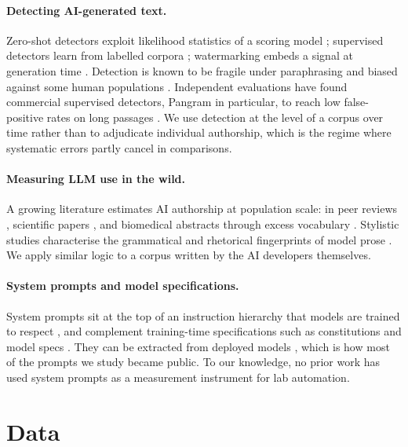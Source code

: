 \documentclass[11pt]{article}
\begin{document}
\paragraph{Detecting AI-generated text.}
Zero-shot detectors exploit likelihood statistics of a scoring model \citep{mitchell2023detectgpt,bao2024fastdetectgpt,hans2024binoculars}; supervised detectors learn from labelled corpora \citep{verma2024ghostbuster,emi2024pangram}; watermarking embeds a signal at generation time \citep{kirchenbauer2023watermark}. Detection is known to be fragile under paraphrasing \citep{sadasivan2023detect} and biased against some human populations \citep{liang2023bias}. Independent evaluations have found commercial supervised detectors, Pangram in particular, to reach low false-positive rates on long passages \citep{jabarian2025detection}. We use detection at the level of a corpus over time rather than to adjudicate individual authorship, which is the regime where systematic errors partly cancel in comparisons.

\paragraph{Measuring LLM use in the wild.}
A growing literature estimates AI authorship at population scale: in peer reviews \citep{liang2024peer}, scientific papers \citep{liang2024papers}, and biomedical abstracts through excess vocabulary \citep{kobak2025delving}. Stylistic studies characterise the grammatical and rhetorical fingerprints of model prose \citep{reinhart2025pnas}. We apply similar logic to a corpus written by the AI developers themselves.

\paragraph{System prompts and model specifications.}
System prompts sit at the top of an instruction hierarchy that models are trained to respect \citep{wallace2024hierarchy}, and complement training-time specifications such as constitutions and model specs \citep{bai2022cai,anthropic2026constitution,openai2024modelspec}. They can be extracted from deployed models \citep{perez2022ignore,zhang2024extraction}, which is how most of the prompts we study became public. To our knowledge, no prior work has used system prompts as a measurement instrument for lab automation.

\section{Data}
\label{sec:data}
\end{document}
